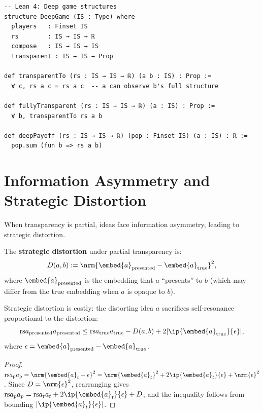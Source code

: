 \begin{lstlisting}
-- Lean 4: Deep game structures
structure DeepGame (IS : Type) where
  players   : Finset IS
  rs        : IS → IS → ℝ
  compose   : IS → IS → IS
  transparent : IS → IS → Prop

def transparentTo (rs : IS → IS → ℝ) (a b : IS) : Prop :=
  ∀ c, rs a c = rs a c  -- a can observe b's full structure

def fullyTransparent (rs : IS → IS → ℝ) (a : IS) : Prop :=
  ∀ b, transparentTo rs a b

def deepPayoff (rs : IS → IS → ℝ) (pop : Finset IS) (a : IS) : ℝ :=
  pop.sum (fun b => rs a b)
\end{lstlisting}

\section{Information Asymmetry and Strategic Distortion}

When transparency is partial, ideas face information asymmetry, leading to
strategic distortion.

\begin{definition}
\label{def:strategic-distortion}
The \textbf{strategic distortion} under partial transparency is:
\[
  D(a, b) := \nrm{\embed{a}_{\text{presented}} - \embed{a}_{\text{true}}}^2,
\]
where $\embed{a}_{\text{presented}}$ is the embedding that $a$ ``presents''
to $b$ (which may differ from the true embedding when $a$ is opaque to $b$).
\end{definition}

\begin{theorem}
\label{thm:distortion-cost}
Strategic distortion is costly: the distorting idea $a$ sacrifices
self-resonance proportional to the distortion:
\[
  \rs{a_{\text{presented}}}{a_{\text{presented}}} \leq
  \rs{a_{\text{true}}}{a_{\text{true}}} - D(a, b) + 2|\ip{\embed{a}_{\text{true}}}{\epsilon}|,
\]
where $\epsilon = \embed{a}_{\text{presented}} - \embed{a}_{\text{true}}$.
\end{theorem}

\begin{proof}
$\rs{a_{\text{p}}}{a_{\text{p}}} = \nrm{\embed{a}_t + \epsilon}^2
= \nrm{\embed{a}_t}^2 + 2\ip{\embed{a}_t}{\epsilon} + \nrm{\epsilon}^2$.
Since $D = \nrm{\epsilon}^2$, rearranging gives
$\rs{a_p}{a_p} = \rs{a_t}{a_t} + 2\ip{\embed{a}_t}{\epsilon} + D$, and
the inequality follows from bounding $|\ip{\embed{a}_t}{\epsilon}|$.
\end{proof}

